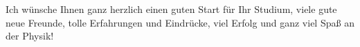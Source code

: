\begin{multicols}{2}
Ich wünsche Ihnen ganz herzlich einen guten Start für Ihr Studium, viele gute neue Freunde, tolle Erfahrungen und Eindrücke, viel Erfolg und ganz viel Spaß an der Physik!






\end{multicols}

\vfill

\newpage

